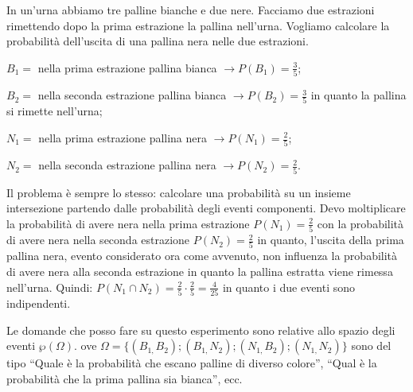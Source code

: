 \begin{exrig}
\begin{esempio}
In un'urna abbiamo tre palline bianche e due nere. Facciamo due estrazioni rimettendo dopo la prima estrazione la pallina nell'urna. Vogliamo calcolare la probabilità dell'uscita di una pallina nera nelle due estrazioni.
\begin{itemize*}
\item $ B_{1}= $ nella prima estrazione pallina bianca $\to P(B_1)=\frac 3 5$;
\item $ B_{2}= $ nella seconda estrazione pallina bianca $\to P(B_2)=\frac 3 5$ in quanto la pallina si rimette nell'urna;
\item $ N_{1}= $ nella prima estrazione pallina nera $\to P(N_1)=\frac 2 5$;
\item $ N_{2}= $ nella seconda estrazione pallina nera $\to P(N_2)=\frac 2 5$.
\end{itemize*}
Il problema è sempre lo stesso: calcolare una probabilità su un insieme intersezione partendo dalle probabilità degli eventi componenti. Devo moltiplicare la probabilità di avere nera nella prima estrazione $P(N_1)=\frac 2 5$ con la probabilità di avere nera nella seconda estrazione $P(N_2)=\frac 2 5$ in quanto, l'uscita della prima pallina nera, evento considerato ora come avvenuto, non influenza la probabilità di avere nera alla seconda estrazione in quanto la pallina estratta viene rimessa nell'urna. Quindi: $P(N_1\cap N_2)=\frac 2 5\cdot \frac 2 5=\frac 4{25}$ in quanto i due eventi sono indipendenti.
\begin{center}
 
\end{center}
Le domande che posso fare su questo esperimento sono relative allo spazio degli eventi $\wp (\Omega ).$ ove $\Omega =\{(B_{1,}B_2);(B_{1,}N_2);(N_{1,}B_2);(N_{1,}N_2)\}$ sono del tipo “Quale è la probabilità che escano palline di diverso colore”, “Qual è la probabilità che la prima pallina sia bianca”, ecc.
\end{esempio}
\end{exrig}


